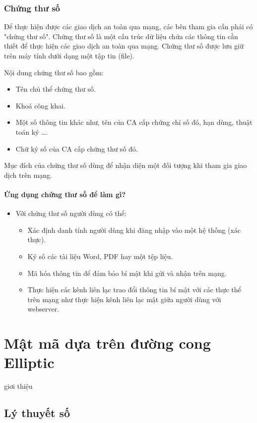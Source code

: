 \documentclass[a4paper,12pt]{report}
\begin{document}
\subsection*{Chứng thư số}
Để thực hiện được các giao dịch an toàn qua mạng, các bên tham gia cần phải có "chứng thư số". Chứng thư số là một cấu trúc dữ liệu chứa các thông tin cần thiết để thực hiện các giao dịch an toàn qua mạng. Chứng thư số được lưu giữ trên máy tính dưới dạng một tập tin (file).

Nội dung chứng thư số bao gồm:
\begin{itemize}
\item Tên chủ thể chứng thư số.
\item Khoá công khai.
\item Một số thông tin khác như, tên của CA cấp chứng chỉ số đó, hạn dùng, thuật toán ký \ldots.
\item Chữ ký số của CA cấp chứng thư số đó.
\end{itemize}

Mục đích của chứng thư số dùng để nhận diện một đối tượng khi tham gia giao dịch trên mạng.

\subsubsection{Ứng dụng chứng thư số để làm gì?}
\begin{itemize}
\item Với chứng thư số người dùng có thể:
\begin{itemize}
\item Xác định danh tính người dùng khi đăng nhập vào một hệ thống (xác thực).
\item Ký số các tài liệu Word, PDF hay một tệp liệu.
\item Mã hóa thông tin để đảm bảo bí mật khi gửi và nhận trên mạng.
\item Thực hiện các kênh liên lạc trao đổi thông tin bí mật với các thực thể trên mạng như thực hiện kênh liên lạc mật giữa người dùng với webserver.
\end{itemize}
\end{itemize}
\chapter{Mật mã dựa trên đường cong Elliptic}
 giơi thiệu 
\section{Lý thuyết số}
\end{document}
